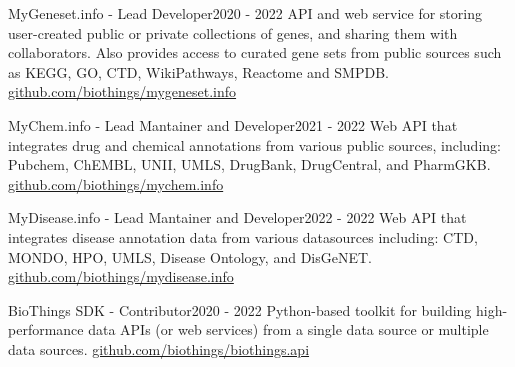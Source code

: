 %
%
%


\begin{projects}
	\project
	{MyGeneset.info - Lead Developer}{2020 - 2022}
	{API and web service for storing user-created public or private collections of genes, and sharing them with collaborators. Also provides access to curated gene sets from public sources such as KEGG, GO, CTD, WikiPathways, Reactome and SMPDB.}
	{\href{https://github.com/biothings/mygeneset.info}{github.com/biothings/mygeneset.info}}
	
	\project
	{MyChem.info - Lead Mantainer and Developer}{2021 - 2022}
	{Web API that integrates drug and chemical annotations from various public sources, including: Pubchem, ChEMBL, UNII, UMLS, DrugBank, DrugCentral, and PharmGKB.}
	{\href{https://github.com/biothings/mychem.info}{github.com/biothings/mychem.info}}
	
	\project
	{MyDisease.info - Lead Mantainer and Developer}{2022 - 2022}
	{Web API that integrates disease annotation data from various datasources including: CTD, MONDO, HPO, UMLS, Disease Ontology, and DisGeNET.}
	{\href{https://github.com/biothings/mydisease.info}{github.com/biothings/mydisease.info}}
	
	\project
	{BioThings SDK - Contributor}{2020 - 2022}
	{Python-based toolkit for building high-performance data APIs (or web services) from a single data source or multiple data sources.}
	{\href{https://github.com/biothings/biothings.api}{github.com/biothings/biothings.api}}
\end{projects}